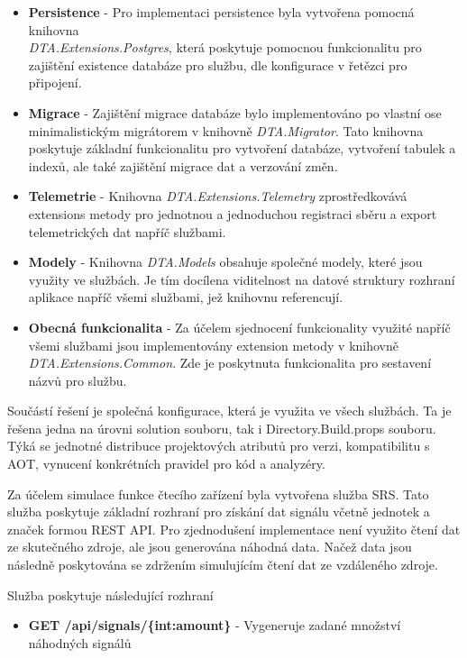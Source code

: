 \begin{itemize}
  \item \textbf{Persistence} - Pro implementaci persistence byla vytvořena pomocná knihovna \\ \emph{DTA.Extensions.Postgres}, která poskytuje pomocnou funkcionalitu pro zajištění existence databáze pro službu, dle konfigurace v řetězci pro připojení.
  \item \textbf{Migrace} - Zajištění migrace databáze bylo implementováno po vlastní ose minimalistickým migrátorem v knihovně \emph{DTA.Migrator}. Tato knihovna poskytuje základní funkcionalitu pro vytvoření databáze, vytvoření tabulek a indexů, ale také zajištění migrace dat a verzování změn.
  \item \textbf{Telemetrie} - Knihovna \emph{DTA.Extensions.Telemetry} zprostředkovává extensions metody pro jednotnou a jednoduchou registraci sběru a export telemetrických dat napříč službami.
  \item \textbf{Modely} - Knihovna \emph{DTA.Models} obsahuje společné modely, které jsou využity ve službách. Je tím docílena viditelnost na datové struktury rozhraní aplikace napříč všemi službami, jež knihovnu referencují.
  \item \textbf{Obecná funkcionalita} - Za účelem sjednocení funkcionality využité napříč všemi službami jsou implementovány extension metody v knihovně \emph{DTA.Extensions.Common}. Zde je poskytnuta funkcionalita pro sestavení názvů pro službu.
\end{itemize}


Součástí řešení je společná konfigurace, která je využita ve všech službách. Ta je řešena jedna na úrovni solution souboru, tak i Directory.Build.props souboru. Týká se jednotné distribuce projektových atributů pro verzi, kompatibilitu s AOT, vynucení konkrétních pravidel pro kód a analyzéry.


Za účelem simulace funkce čtecího zařízení byla vytvořena služba SRS. Tato služba poskytuje základní rozhraní pro získání dat signálu včetně jednotek a značek formou REST API. Pro zjednodušení implementace není využito čtení dat ze skutečného zdroje, ale jsou generována náhodná data. Načež data jsou následně poskytována se zdržením simulujícím čtení dat ze vzdáleného zdroje.

Služba poskytuje následující rozhraní

\begin{itemize}
    \item \textbf{GET /api/signals/\{int:amount\}} - Vygeneruje zadané množství náhodných signálů
\end{itemize}

